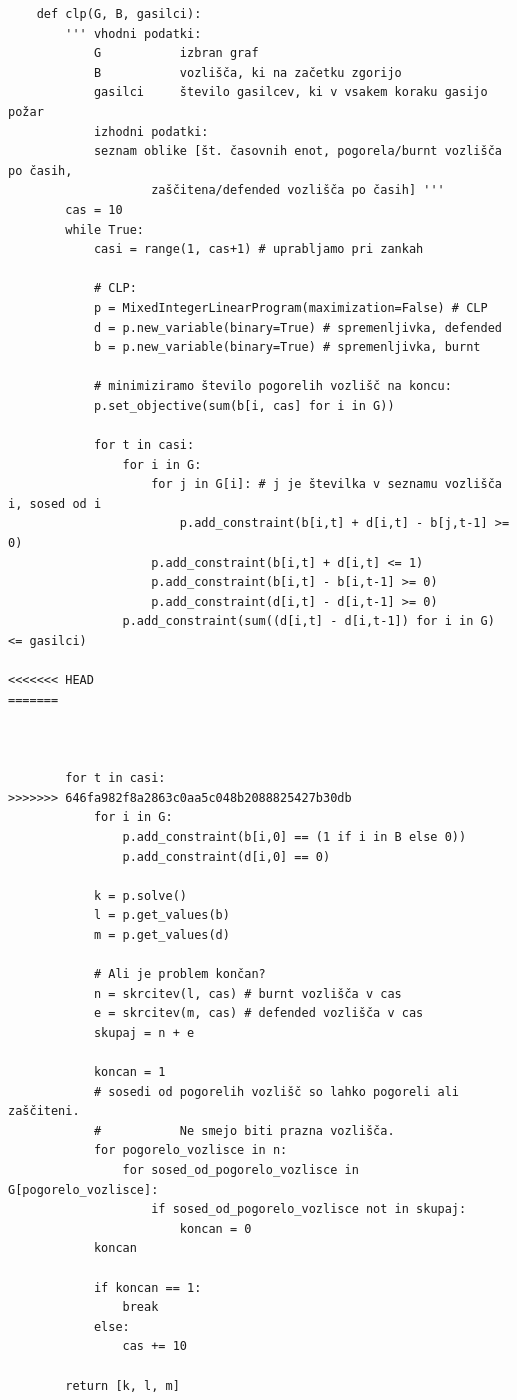\documentclass[a4paper, 12pt]{article}
\begin{document}
\begin{scriptsize}
\begin{verbatim}
    def clp(G, B, gasilci):
        ''' vhodni podatki:
            G           izbran graf
            B           vozlišča, ki na začetku zgorijo
            gasilci     število gasilcev, ki v vsakem koraku gasijo požar
            izhodni podatki:
            seznam oblike [št. časovnih enot, pogorela/burnt vozlišča po časih, 
                    zaščitena/defended vozlišča po časih] '''
        cas = 10
        while True:
            casi = range(1, cas+1) # uprabljamo pri zankah
        
            # CLP:
            p = MixedIntegerLinearProgram(maximization=False) # CLP
            d = p.new_variable(binary=True) # spremenljivka, defended
            b = p.new_variable(binary=True) # spremenljivka, burnt

            # minimiziramo število pogorelih vozlišč na koncu:
            p.set_objective(sum(b[i, cas] for i in G)) 

            for t in casi:
                for i in G:
                    for j in G[i]: # j je številka v seznamu vozlišča i, sosed od i
                        p.add_constraint(b[i,t] + d[i,t] - b[j,t-1] >= 0)
                    p.add_constraint(b[i,t] + d[i,t] <= 1)
                    p.add_constraint(b[i,t] - b[i,t-1] >= 0)
                    p.add_constraint(d[i,t] - d[i,t-1] >= 0)
                p.add_constraint(sum((d[i,t] - d[i,t-1]) for i in G) <= gasilci)

<<<<<<< HEAD
=======



        for t in casi:
>>>>>>> 646fa982f8a2863c0aa5c048b2088825427b30db
            for i in G:
                p.add_constraint(b[i,0] == (1 if i in B else 0))
                p.add_constraint(d[i,0] == 0)
                
            k = p.solve()
            l = p.get_values(b)
            m = p.get_values(d)
            
            # Ali je problem končan?
            n = skrcitev(l, cas) # burnt vozlišča v cas
            e = skrcitev(m, cas) # defended vozlišča v cas
            skupaj = n + e
            
            koncan = 1
            # sosedi od pogorelih vozlišč so lahko pogoreli ali zaščiteni. 
            #           Ne smejo biti prazna vozlišča.
            for pogorelo_vozlisce in n:
                for sosed_od_pogorelo_vozlisce in G[pogorelo_vozlisce]:
                    if sosed_od_pogorelo_vozlisce not in skupaj:
                        koncan = 0
            koncan
            
            if koncan == 1:
                break
            else:
                cas += 10
            
        return [k, l, m]\end{verbatim}
\end{scriptsize}
\end{document}
